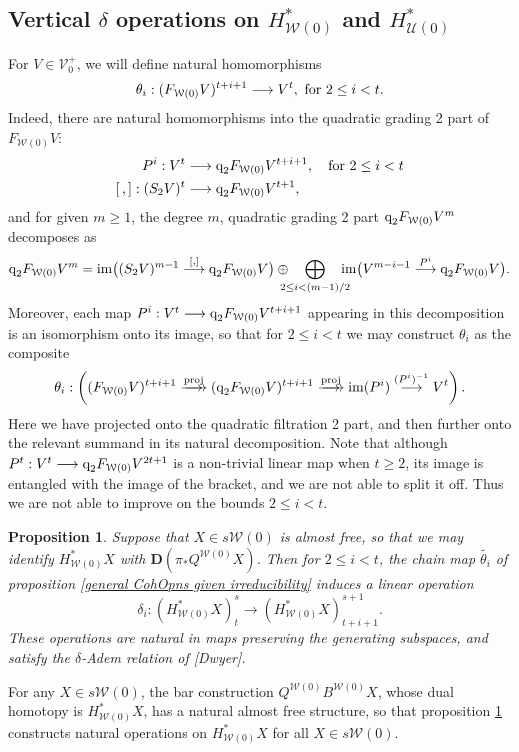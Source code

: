 \documentclass[11pt]{amsart}
\theoremstyle{plain}
\newtheorem{prop}[thm]{Proposition}
\theoremstyle{definition}
\DeclareMathOperator{\im}{im}
\renewcommand{\to}{\longrightarrow}
\newcommand{\calU}{\mathcal{U}}
\newcommand{\calV}{\mathcal{V}}
\newcommand{\calw}{\mathcal{W}}
\theoremstyle{plain}
\newcommand{\vect}[2]{\calV^{#1}_{#2}}
\newcommand{\quadgrad}[1]{\textup{q}_{#1}}
\newcommand{\dual}{\mathbf{D}}
\begin{document}
\begin{Cohomology Operations for W and U}
\subsection{Vertical $\delta$ operations on $H^*_{\calw(0)}$ and $H^*_{\calU(0)}$}
For $V\in \vect{+}{0}$, we will define natural homomorphisms
\[\theta_i:(F_{\calw(0)}V)^{t+i+1}\to V^{t}, \textup{ for $2\leq i<t$}.\]
Indeed, there are natural homomorphisms into the quadratic grading 2 part of $F_{\calw(0)}V$:
\begin{align*}
P^i:V^{t}&\to \quadgrad{2}F_{\calw(0)}V^{t+i+1}, \textup{\quad  for $2\leq i<t$}\\
[\,,]:(S_2V)^{t}&\to \quadgrad{2}F_{\calw(0)}V^{t+1},
\end{align*}
and for given $m\geq1$, the degree $m$, quadratic grading 2 part $\quadgrad{2}F_{\calw(0)}V^m$ decomposes as
%
\[\quadgrad{2}F_{\calw(0)}V^{m}=%
\im \bigl((S_2V)^{m-1}\overset{[,]}{\to} \quadgrad{2}F_{\calw(0)}V\bigr)%
\oplus\bigoplus_{\!\!\!\!\!\!2\leq i< (m-1)/2\!\!\!\!\!\!}\im \bigl(V^{m-i-1}\overset{P^i}{\to}\quadgrad{2}F_{\calw(0)}V\bigr).\]
Moreover, each map $P^i:V^t\to \quadgrad{2}F_{\calw(0)}V^{t+i+1}$ appearing in this decomposition is an isomorphism onto its image, so that for $2\leq i <t$ we may construct $\theta_i$ as the composite
\[\theta_i:\left((F_{\calw(0)}V)^{t+i+1}\overset{\textup{proj}}{\makebox[.06ex][l]{$\to$}\to} (\quadgrad{2}F_{\calw(0)}V)^{t+i+1}\overset{\textup{proj}}{\makebox[.06ex][l]{$\to$}\to} \im (P^i)\overset{(P^i)^{-1}}{\to}V^{t}\right).\]
Here we have projected onto the quadratic filtration 2 part, and then further onto the relevant summand in its natural decomposition. Note that although $P^t:V^t\to \quadgrad{2}F_{\calw(0)}V^{2t+1}$ is a non-trivial linear map when $t\geq2$, its image is entangled with the image of the bracket, and we are not able to split it off. Thus we are not able to improve on the bounds $2\leq i< t$.
\begin{prop}\label{operations on goerss homology}
Suppose that $X\in s\calw(0)$ is almost free, so that we may identify $H^*_{\calw(0)}X$ with $\dual(\pi_*Q^{\calw(0)}X)$. Then for $2\leq i <t$, the chain map $\widetilde{\theta_i}$ of proposition \ref{general CohOpns given irreducibility} induces a linear operation
\[\delta_i:(H^*_{\calw(0)}X)^{s}_t\to (H^*_{\calw(0)}X)^{s+1}_{t+i+1}.\] 
These operations are natural in maps preserving the generating subspaces, and satisfy the $\delta$-Adem relation of [Dwyer].
\end{prop}
\noindent For any $X\in s\calw(0)$, the bar construction $Q^{\calw(0)}B^{\calw(0)}X$, whose dual homotopy is $H^*_{\calw(0)}X$, has a natural almost free structure, so that proposition \ref{operations on goerss homology} constructs natural  operations on $H^*_{\calw(0)}X$ for all $X\in s\calw(0)$.


\end{Cohomology Operations for W and U}
\end{document}
